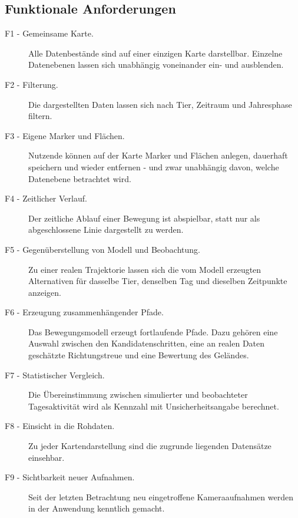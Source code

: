 \documentclass[12pt,a4paper]{report}
\begin{document}
\subsection{Funktionale Anforderungen}

\begin{description}
    \item[F1 - Gemeinsame Karte.] Alle Datenbestände sind auf einer einzigen Karte
    darstellbar. Einzelne Datenebenen lassen sich unabhängig voneinander ein- und
    ausblenden.

    \item[F2 - Filterung.] Die dargestellten Daten lassen sich nach Tier, Zeitraum und
    Jahresphase filtern.

    \item[F3 - Eigene Marker und Flächen.] Nutzende können auf der Karte Marker und
    Flächen anlegen, dauerhaft speichern und wieder entfernen - und zwar unabhängig
    davon, welche Datenebene betrachtet wird.

    \item[F4 - Zeitlicher Verlauf.] Der zeitliche Ablauf einer Bewegung ist abspielbar,
    statt nur als abgeschlossene Linie dargestellt zu werden.

    \item[F5 - Gegenüberstellung von Modell und Beobachtung.] Zu einer realen Trajektorie
    lassen sich die vom Modell erzeugten Alternativen für dasselbe Tier, denselben Tag und
    dieselben Zeitpunkte anzeigen.

    \item[F6 - Erzeugung zusammenhängender Pfade.] Das Bewegungsmodell erzeugt
    fortlaufende Pfade. Dazu gehören eine Auswahl zwischen den Kandidatenschritten, eine
    an realen Daten geschätzte Richtungstreue und eine Bewertung des Geländes.

    \item[F7 - Statistischer Vergleich.] Die Übereinstimmung zwischen simulierter und
    beobachteter Tagesaktivität wird als Kennzahl mit Unsicherheitsangabe berechnet.

    \item[F8 - Einsicht in die Rohdaten.] Zu jeder Kartendarstellung sind die
    zugrunde liegenden Datensätze einsehbar.

    \item[F9 - Sichtbarkeit neuer Aufnahmen.] Seit der letzten Betrachtung neu
    eingetroffene Kameraaufnahmen werden in der Anwendung kenntlich gemacht.
\end{description}
\end{document}
